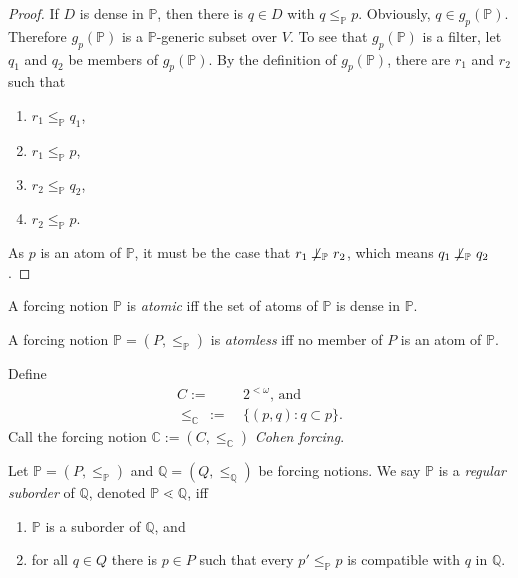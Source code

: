 \documentclass[12pt]{article}
\numberwithin{equation}{section}
\begin{document}
\begin{proof}
If $D$ is dense in $\mathbb{P}$, then there is $q \in D$ with $q \leq_{\mathbb{P}} p$. Obviously, $q \in g_p (\mathbb{P})$. Therefore $g_p (\mathbb{P})$ is a $\mathbb{P}$-generic subset over $V$. To see that $g_p (\mathbb{P})$ is a filter, let $q_1$ and $q_2$ be members of $g_p (\mathbb{P})$. By the definition of $g_p (\mathbb{P})$, there are $r_1$ and $r_2$ such that 
\begin{enumerate}[label=(\alph*)]
    \item $r_1 \leq_{\mathbb{P}} q_1$, 
    \item $r_1 \leq_{\mathbb{P}} p$,
    \item $r_2 \leq_{\mathbb{P}} q_2$,
    \item $r_2 \leq_{\mathbb{P}} p$.
\end{enumerate}
As $p$ is an atom of $\mathbb{P}$, it must be the case that $r_1 \not \! \! \bot_{\mathbb{P}} \ r_2$, which means $q_1 \not \! \! \bot_{\mathbb{P}} \ q_2$.
\end{proof}

\begin{defi}
A forcing notion $\mathbb{P}$ is \emph{atomic} iff the set of atoms of $\mathbb{P}$ is dense in $\mathbb{P}$.
\end{defi}

\begin{defi}
A forcing notion $\mathbb{P} = (P, \leq_{\mathbb{P}})$ is \emph{atomless} iff no member of $P$ is an atom of $\mathbb{P}$.
\end{defi}

\begin{defi}
Define
\begin{align*}
    C := \ & 2^{< \omega} \text{, and} \\
    \leq_{\mathbb{C}} \ := \ & \{(p, q) : q \subset p\} \text{.}
\end{align*}
Call the forcing notion $\mathbb{C} := (C, \leq_{\mathbb{C}})$ \emph{Cohen forcing}.
\end{defi}

\begin{defi}
Let $\mathbb{P} = (P, \leq_{\mathbb{P}})$ and $\mathbb{Q} = (Q, \leq_{\mathbb{Q}})$ be forcing notions. We say $\mathbb{P}$ is a \emph{regular suborder} of $\mathbb{Q}$, denoted $\mathbb{P} \lessdot \mathbb{Q}$, iff 
\begin{enumerate}[label=(\alph*)]
    \item $\mathbb{P}$ is a suborder of $\mathbb{Q}$, and
    \item for all $q \in Q$ there is $p \in P$ such that every $p' \leq_{\mathbb{P}} p$ is compatible with $q$ in $\mathbb{Q}$.
\end{enumerate}
\end{defi}
\end{document}
